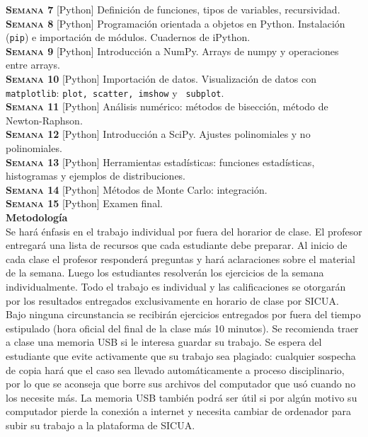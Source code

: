 \documentclass[letterpaper,10pt,onecolumn]{article}
\begin{document}
\noindent\textbf{\textsc{Semana 7}} [Python] Definición de funciones,
tipos de variables, recursividad. \\[-0.3cm] 

\noindent\textbf{\textsc{Semana 8}} [Python] Programaci\'on orientada
a objetos en Python. Instalación (\verb+pip+) e
importación de módulos. Cuadernos de iPython.\\[-0.3cm]  

\noindent\textbf{\textsc{Semana 9}} [Python] Introducción a
NumPy. Arrays de numpy y operaciones entre arrays. \\[-0.3cm]  

\noindent\textbf{\textsc{Semana 10}} [Python] Importación de datos. Visualización de datos con
\verb+matplotlib+: \verb+plot, scatter, imshow+ y  \verb+ subplot+.\\[-0.3cm]  

\noindent\textbf{\textsc{Semana 11}} [Python] Análisis numérico:
métodos de bisección, método de Newton-Raphson. \\[-0.3cm]  

\noindent\textbf{\textsc{Semana 12}} [Python] Introducción a
SciPy. Ajustes polinomiales y no polinomiales.\\[-0.3cm]  

\noindent\textbf{\textsc{Semana 13}} [Python] Herramientas
estadísticas: funciones estadísticas, histogramas y ejemplos de
distribuciones.\\[-0.3cm] 

\noindent\textbf{\textsc{Semana 14}} [Python] Métodos de Monte Carlo:
integración.\\[-0.3cm] 

\noindent\textbf{\textsc{Semana 15}} [Python] Examen final. \\[0.1cm] 

\noindent\textbf{\large {} \quad Metodología}\\[-0.2cm]

\noindent\normalsize Se har\'a \'enfasis en el trabajo individual por
fuera del horarior de clase. El profesor entregar\'a una lista de
recursos que cada estudiante debe preparar. 
Al inicio de cada clase el profesor responderá preguntas y 
hará aclaraciones sobre el material de la semana. Luego los
estudiantes resolverán los ejercicios de la semana individualmente. 
Todo el trabajo es individual y las calificaciones se otorgar\'an por
los resultados entregados exclusivamente en horario de clase por SICUA. 
Bajo ninguna circunstancia se recibirán ejercicios entregados por fuera 
del tiempo estipulado (hora oficial del final de la clase más 10 minutos).
Se recomienda traer a clase una memoria USB si le interesa guardar su 
trabajo. Se espera del estudiante que evite activamente que
su trabajo sea plagiado: cualquier sospecha de copia hará que el caso sea
llevado automáticamente a proceso disciplinario, por lo que se aconseja
que borre sus archivos del computador que usó cuando no los necesite más.
La memoria USB también podrá ser útil si por algún motivo su computador
pierde la conexión a internet y necesita cambiar de ordenador para subir
su trabajo a la plataforma de SICUA.
\\[0.1cm] 
\end{document}
